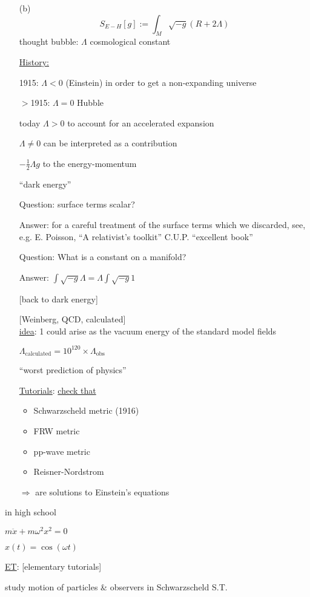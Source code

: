 \documentclass[10pt, twoside]{amsart}
\begin{document}
\begin{multicols*}{2}
\begin{enumerate}
\item[(b)] \[
S_{E-H}[g] := \int_M \sqrt{-g} (R+ 2\Lambda)
\]
thought bubble: $\Lambda$ cosmological constant

\underline{History:}

1915: $\Lambda < 0$ (Einstein) in order to get a non-expanding universe

$>$1915: $\Lambda =0$ Hubble 

today $\Lambda > 0$ to account for an accelerated expansion

$\Lambda \neq 0$ can be interpreted as a contribution

$-\frac{1}{2} \Lambda g$ to the energy-momentum 

``dark energy''

Question: surface terms scalar?

Answer: for a careful treatment of the surface terms which we discarded, see, e.g. E. Poisson, ``A relativist's toolkit'' C.U.P. ``excellent book''

Question: What is a constant on a manifold?

Answer: $\int \sqrt{-g} \Lambda = \Lambda \int \sqrt{-g} 1$

[back to dark energy]

[Weinberg, QCD, calculated] \\
\underline{idea}: 1 could arise as the vacuum energy of the standard model fields 

$\Lambda_{\text{calculated}} = 10^{120} \times \Lambda_{\text{obs}}$

``worst prediction of physics''

\underline{Tutorials}: \underline{check that }
\begin{itemize}
\item Schwarzscheld metric (1916)
\item FRW metric 
\item pp-wave metric 
\item Reisner-Nordstrom 
\end{itemize}
$\Longrightarrow $ are solutions to Einstein's equations
\end{enumerate}

in high school 

$m\ddot{x} + m\omega^2 x^2=0$

$x(t) = \cos{(\omega t)}$

\underline{ET}: [elementary tutorials]

study motion of particles \& observers in Schwarzscheld S.T.


\end{multicols*}
\end{document}
